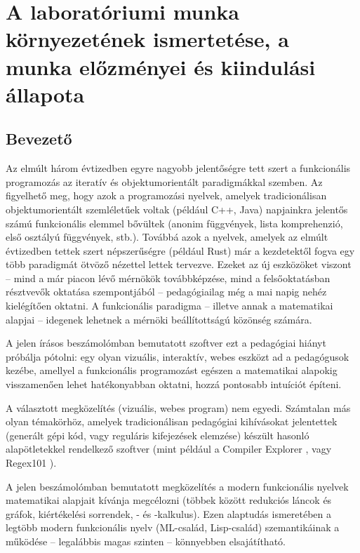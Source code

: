 \documentclass[a4paper,oneside]{article}
\begin{document}
\section{A laboratóriumi munka környezetének ismertetése,
  a munka előzményei és kiindulási állapota}
\label{sec:kornyezet}
\subsection{Bevezető}
\label{sec:bevezeto}

Az elmúlt három évtizedben egyre nagyobb jelentőségre tett szert a funkcionális programozás az iteratív és objektumorientált paradigmákkal szemben. Az figyelhető meg, hogy azok a programozási nyelvek, amelyek tradicionálisan objektumorientált szemléletűek voltak (például C++, Java) napjainkra jelentős számú funkcionális elemmel bővültek (anonim függvények, lista komprehenzió, első osztályú függvények, stb.). Továbbá azok a nyelvek, amelyek az elmúlt évtizedben tettek szert népszerűségre (például Rust) már a kezdetektől fogva egy több paradigmát ötvöző nézettel lettek tervezve. Ezeket az új eszközöket viszont -- mind a már piacon lévő mérnökök továbbképzése, mind a felsőoktatásban résztvevők oktatása szempontjából -- pedagógiailag még a mai napig nehéz kielégítően oktatni. A funkcionális paradigma -- illetve annak a matematikai alapjai -- idegenek lehetnek a mérnöki beállítottságú közönség számára.

A jelen írásos beszámolómban bemutatott szoftver ezt a pedagógiai hiányt próbálja pótolni: egy olyan vizuális, interaktív, webes eszközt ad a pedagógusok kezébe, amellyel a funkcionális programozást egészen a matematikai alapokig visszamenően lehet hatékonyabban oktatni, hozzá pontosabb intuíciót építeni.

A választott megközelítés (vizuális, webes program) nem egyedi. Számtalan más olyan témakörhöz, amelyek tradicionálisan pedagógiai kihívásokat jelentettek (generált gépi kód, vagy reguláris kifejezések elemzése) készült hasonló alapötletekkel rendelkező szoftver (mint például a Compiler Explorer \cite{godboltCompilerExplorer}, vagy Regex101 \cite{dibRegex101BuildTest}).

A jelen beszámolómban bemutatott megközelítés a modern funkcionális nyelvek matematikai alapjait kívánja megcélozni (többek között redukciós láncok és gráfok, kiértékelési sorrendek, \lam- és \ski-kalkulus). Ezen alaptudás ismeretében a legtöbb modern funkcionális nyelv (ML-család, Lisp-család) szemantikáinak a működése -- legalábbis magas szinten -- könnyebben elsajátítható.
\end{document}
